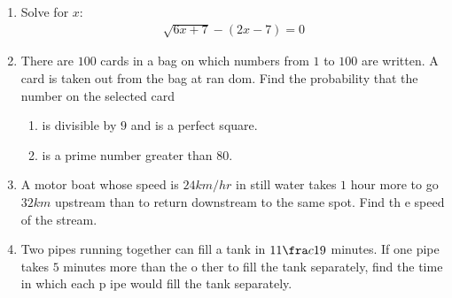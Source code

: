 \documentclass{article}                                         %
\begin{document}
                                                                                                                \begin{enumerate}
\item Solve for $x$:
    \begin{align}
        \sqrt{6x + 7} - (2x - 7) = 0
    \end{align}
\item There are $100$ cards in a bag on which numbers from $
1$ to $100$ are written. A card is taken out from the bag at ran
dom. Find the probability that the number on the selected card
    \begin{enumerate}
        \item is divisible by $9$ and is a perfect square.
        \item is a prime number greater than $80$.                  \end{enumerate}
\item A motor boat whose speed is $24 km/hr$ in still water takes $1$ hour     more to go $32 km$ upstream than to return downstream to the same spot. Find th
    e speed of the stream.
\item Two pipes running together can fill a tank in $11\fra    c{1}{9}$ minutes. If one pipe takes $5$ minutes more than the o    ther to fill the tank separately, find the time in which each p    ipe would fill the tank separately.
								\end{enumerate}                                                 
\end{document}
